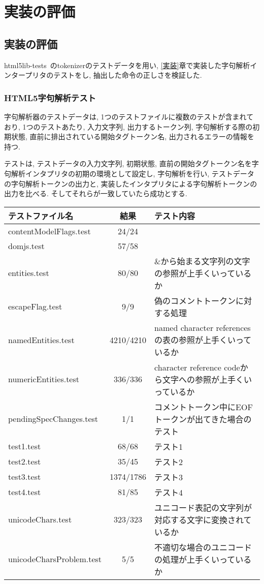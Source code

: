 \documentclass[uplatex,a4j]{jsreport}
\begin{document}
\chapter{実装の評価}
\label{評価}
\section{実装の評価}
html5lib-tests~\cite{html5lib-tests}のtokenizerのテストデータを用い, \ref{実装}章で実装した字句解析インタープリタのテストをし, 抽出した命令の正しさを検証した.
\subsection{HTML5字句解析テスト}
字句解析器のテストデータは, 1つのテストファイルに複数のテストが含まれており, 
1つのテストあたり, 入力文字列, 出力するトークン列, 字句解析する際の初期状態, 直前に排出されている開始タグトークン名, 出力されるエラーの情報を持つ. 

テストは, テストデータの入力文字列, 初期状態, 直前の開始タグトークン名を字句解析インタプリタの初期の環境として設定し, 
字句解析を行い, 
テストデータの字句解析トークンの出力と, 実装したインタプリタによる字句解析トークンの出力を比べる. 
そしてそれらが一致していたら成功とする. 
\begin{table}[htb]
    \begin{tabular}{|l|c|l|} \hline
      テストファイル名 & 結果 & テスト内容\\ \hline 
      contentModelFlags.test & 24/24 &  \\
      domjs.test & 57/58 &  \\
      entities.test & 80/80 & \&から始まる文字列の文字の参照が上手くいっているか\\
      escapeFlag.test & 9/9 & 偽のコメントトークンに対する処理\\
      namedEntities.test & 4210/4210 & named character referencesの表の参照が上手くいっているか\\
      numericEntities.test & 336/336 & character reference codeから文字への参照が上手くいっているか\\
      pendingSpecChanges.test & 1/1 & コメントトークン中にEOFトークンが出てきた場合のテスト\\
      test1.test & 68/68 & テスト1 \\
      test2.test & 35/45 & テスト2 \\
      test3.test & 1374/1786 & テスト3 \\
      test4.test & 81/85 & テスト4 \\
      unicodeChars.test & 323/323 & ユニコード表記の文字列が対応する文字に変換されているか\\
      unicodeCharsProblem.test & 5/5 & 不適切な場合のユニコードの処理が上手くいっているか\\ \hline 
    \end{tabular}
\end{table}
\end{document}
